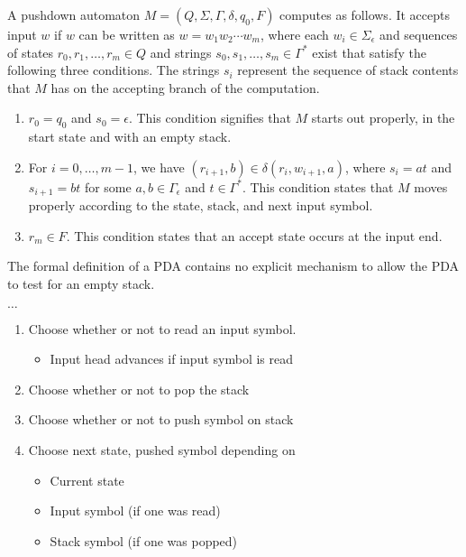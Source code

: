 \documentclass{article}
\begin{document}
A pushdown automaton $M = (Q, \Sigma, \Gamma, \delta, q_0 , F)$ computes as follows. It accepts input $w$ if $w$ can be written as $w = w_1 w_2 \cdots w_m$, where each $w_i \in \Sigma_{\epsilon}$ and sequences of states $r_0 , r_1 , \dots , r_m \in Q$ and strings $s_0 , s_1 , \dots , s_m \in \Gamma^{*}$ exist that satisfy the following three conditions. The strings $s_i$ represent the sequence of stack contents that $M$ has on the accepting branch of the computation. 
\begin{enumerate}
  \item $r_0 = q_0$ and $s_0 = \epsilon$. This condition signifies that $M$ starts out properly, in the start state and with an empty stack. 
  \item For $i = 0, \dots , m-1$, we have $(r_{i+1},b) \in \delta(r_i , w_{i+1}, a)$, where $s_i = at$ and $s_{i+1} = bt$ for some $a,b \in \Gamma_{\epsilon}$ and $t \in \Gamma^{*}$. This condition states that $M$ moves properly according to the state, stack, and next input symbol. 
  \item $r_m \in F$. This condition states that an accept state occurs at the input end. 
\end{enumerate}

\begin{remark}
  The formal definition of a PDA contains no explicit mechanism to allow the PDA to test for an empty stack.
\end{remark}

\begin{remark}$\dots$
  \begin{enumerate}
    \item Choose whether or not to read an input symbol. 
      \begin{itemize}
        \item Input head advances if input symbol is read 
      \end{itemize}
    \item Choose whether or not to pop the stack 
    \item Choose whether or not to push symbol on stack 
    \item Choose next state, pushed symbol depending on 
      \begin{itemize}
        \item Current state 
        \item Input symbol (if one was read) 
        \item Stack symbol (if one was popped)
      \end{itemize}
  \end{enumerate}
\end{remark}
\end{document}
